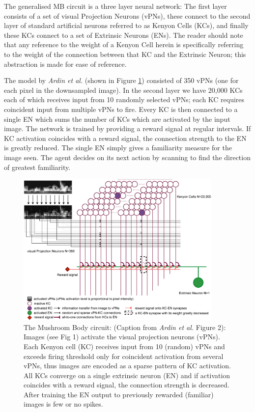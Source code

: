 \documentclass[a4paper,12pt]{article}
\begin{document}
The generalised MB circuit is a three layer neural network: The first layer consists of a set of
visual Projection Neurons (vPNs), these connect to the second layer of standard artificial neurons
referred to as Kenyon Cells (KCs), and finally these KCs connect to a set of Extrinsic Neurons (ENs).
The reader should note that any reference to the weight of a Kenyon Cell herein is specifically referring
to the weight of the connection between that KC and the Extrinsic Neuron; this abstraction is made for
ease of reference.
\newline

The model by \textit{Ardin et al.} (shown in Figure \ref{fig:ardinmb}) consisted of 350 vPNs
(one for each pixel in the downsampled image). In the second layer we have 20,000 KCs each of
which receives input from 10 randomly selected vPNs; each KC requires coincident input from multiple
vPNs to fire. Every KC is then connected to a single EN which sums the number of KCs which are
activated by the input image. The network is trained by providing a reward signal at regular
intervals. If KC activation coincides with a reward signal, the connection strength to the EN is
greatly reduced. The single EN simply gives a familiarity measure for the image seen. The agent
decides on its next action by scanning to find the direction of greatest familiarity.
\newline

\begin{figure}
  \centering
  \includegraphics[width=0.9\textwidth]{Ardin2010MBModel}
  \caption{
    \label{fig:ardinmb} The Mushroom Body circuit: (Caption from \textit{Ardin et al.} Figure 2):
    Images (see Fig 1) activate the visual projection neurons (vPNs). Each Kenyon cell (KC) receives
    input from 10 (random) vPNs and exceeds firing threshold only for coincident activation from
    several vPNs, thus images are encoded as a sparse pattern of KC activation. All KCs converge on
    a single extrinsic neuron (EN) and if activation coincides with a reward signal, the connection
    strength is decreased. After training the EN output to previously rewarded (familiar) images is
    few or no spikes.
  }
\end{figure}
\end{document}
